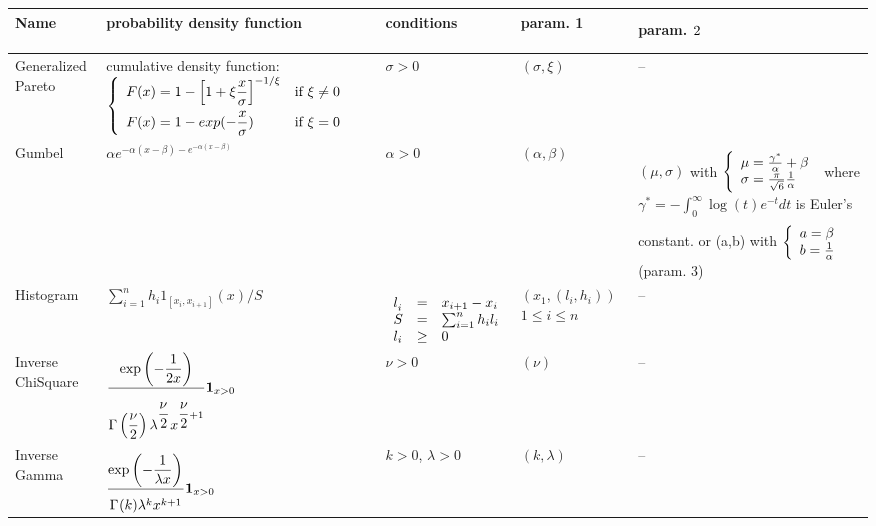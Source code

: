 {  \noindent \begin{tabular}{|p{2cm}|p{5.3cm}|p{2.7cm}|p{1.7cm}|p{4.6cm}|}
    \hline
    Name & probability density function & conditions & param. 1 & param. $2^{\strut}_{\strut}$\\
    \hline
    Generalized Pareto & cumulative density function: $  \left\{
      \begin{array}{ll}
        \displaystyle F(x) =  1-\left[
          1+\xi\frac{x}{\sigma}\right]_{\strut}^{-1/\xi} & \mbox{if } \xi \neq 0 \\
        \displaystyle F(x) =  1-exp(-\frac{x}{\sigma}) & \mbox{if } \xi = 0
      \end{array}
    \right. $
    & $\sigma >0$  & $( \sigma, \xi)$ & -- \\
    \hline
    \fi %
    Gumbel & $ \displaystyle \alpha e^{-\alpha(x-\beta)-e^{-\alpha(x-\beta)}}$ & $\alpha >0 $ & $(\alpha, \beta)$ & $(\mu, \sigma)$ with $
    \left\{
      \begin{array}{l}
        \mu = \frac{\gamma^{*}}{\alpha} + \beta \\
        \sigma = \frac{\pi}{\sqrt{6}} \frac{1}{\alpha}
      \end{array}
    \right.^{\strut}
    $
    where $ \displaystyle \gamma^{*} = -\int_0^{\infty} \log(t)e^{-t}dt$ is Euler's constant.
    or (a,b) with $
    \left\{
      \begin{array}{l}
        a = \beta \\
        b = \frac{1}{\alpha}
      \end{array}
    \right.^{\strut}
    $
    (param. 3)
    \\
    \hline
    Histogram & $ \displaystyle \sum_{i=1}^{n} h_i1_{[x_i, x_{i+1}]}(x)/S $ & $\begin{array}{lcl}
      l_i^{\strut} & = & x_{i+1} - x_i\\
      S & = & \sum_{i=1}^n h_i l_i \\
      l_i & \geq & 0
    \end{array}
    $ & $(x_1, (l_i, h_i))$ ${1\leq i \leq n} $ & -- \\
    \hline
    Inverse ChiSquare & $\displaystyle \dfrac{\exp \left( -\dfrac{1}{2 x}\right)}{\Gamma \left(\dfrac{\nu}{2}\right)\lambda^{\dfrac{\nu^{\strut}}{2}}x^{\dfrac{\nu}{2}+1}} \mathbf{1}_{x>0} $ & $\nu>0$& $(\nu)$ & -- \\
    \hline
    Inverse Gamma & $\displaystyle  \frac{\exp \left( -\dfrac{1}{\lambda x}\right)^{\strut}}{\Gamma^{\strut}(k)\lambda^kx^{k+1}} \mathbf{1}_{x>0}$ & $k>0$, $\lambda>0$ & $(k,\lambda)$ & -- \\

\end{tabular}}
